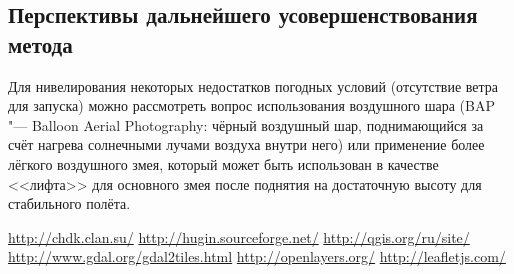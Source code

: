 \documentclass[10pt, a5paper]{article}
\begin{document}
\subsection*{Перспективы дальнейшего усовершенствования \linebreak метода}

Для нивелирования некоторых недостатков погодных условий (отсутствие ветра для запуска) можно рассмотреть вопрос использования воздушного шара (BAP "--- Balloon Aerial Photography: чёрный воздушный шар, поднимающийся за счёт нагрева солнечными лучами воздуха внутри него) или применение более лёгкого воздушного змея, который может быть использован в качестве <<лифта>> для основного змея после поднятия на достаточную высоту для стабильного полёта.

\begin{thebibliography}{9}
 \url{http://chdk.clan.su/}
 \url{http://hugin.sourceforge.net/}
 \url{http://qgis.org/ru/site/}
 \url{http://www.gdal.org/gdal2tiles.html}
 \url{http://openlayers.org/}
 \url{http://leafletjs.com/}\end{thebibliography}
\end{document}
